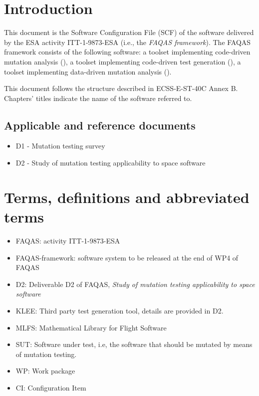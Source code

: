 
\chapter{Introduction}

This document is the Software Configuration File (SCF) of the software delivered by the ESA activity ITT-1-9873-ESA (i.e., the \emph{FAQAS framework}).
The FAQAS framework consists of the following software: a toolset  implementing code-driven mutation analysis (\MASS), a toolset implementing code-driven test generation (\SEMUS), a toolset implementing data-driven mutation analysis (\DAMA).

This document follows the structure described in ECSS-E-ST-40C Annex B. Chapters' titles indicate the name of the software referred to.

\section{Applicable and reference documents}

\begin{itemize}
\item{D1 - Mutation testing survey}
\item{D2 - Study of mutation testing applicability to space software}
\end{itemize}

\chapter{Terms, definitions and abbreviated terms}

\begin{itemize}
\item{FAQAS}: activity ITT-1-9873-ESA
\item{FAQAS-framework}: software system to be released at the end of WP4 of FAQAS
\item{D2}: Deliverable D2 of FAQAS, \emph{Study of mutation testing applicability to space software}
\item{KLEE}: Third party test generation tool, details are provided in D2.
\item{MLFS}: Mathematical Library for Flight Software
\item{SUT}: Software under test, i.e, the software that should be mutated by means of mutation testing.
\item{WP}: Work package
\item{CI}: Configuration Item

\end{itemize}

\clearpage
